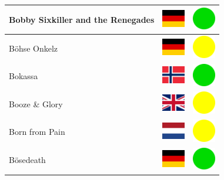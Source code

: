 \documentclass[12pt, a4paper, twoside]{report}
\begin{document}
\begin{center}
\begin{longtable}{|p{5cm}|p{2cm}|p{2cm}|}
Bobby Sixkiller and the Renegades & \includegraphics[width=1cm]{4x3/de} & \includegraphics[width=1cm]{likes/y} \\ \hline
Böhse Onkelz & \includegraphics[width=1cm]{4x3/de} & \includegraphics[width=1cm]{likes/m} \\ \hline
Bokassa & \includegraphics[width=1cm]{4x3/no} & \includegraphics[width=1cm]{likes/y} \\ \hline
Booze \& Glory & \includegraphics[width=1cm]{4x3/gb} & \includegraphics[width=1cm]{likes/m} \\ \hline
Born from Pain & \includegraphics[width=1cm]{4x3/nl} & \includegraphics[width=1cm]{likes/m} \\ \hline
Bösedeath & \includegraphics[width=1cm]{4x3/de} & \includegraphics[width=1cm]{likes/y} \\ \hline

\end{longtable}
\end{center}
\end{document}
